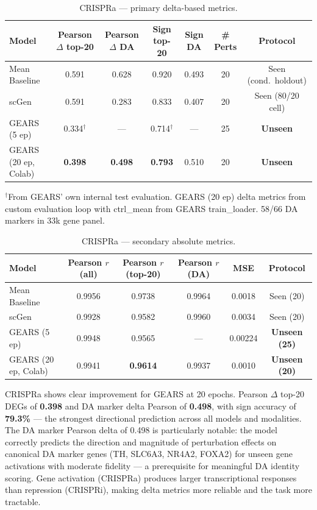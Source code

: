\documentclass[11pt,letterpaper]{article}
\begin{document}
\begin{table}[h]
\centering
\caption{CRISPRa --- primary delta-based metrics.}
\small
\begin{tabular}{lcccccc}
\toprule
Model & Pearson $\Delta$ top-20 & Pearson $\Delta$ DA & Sign top-20 & Sign DA & \# Perts & Protocol \\
\midrule
Mean Baseline        & 0.591           & 0.628           & 0.920 & 0.493 & 20 & Seen (cond.\ holdout) \\
scGen                & 0.591           & 0.283           & 0.833 & 0.407 & 20 & Seen (80/20 cell) \\
GEARS (5 ep)         & 0.334$^\dagger$ & ---             & 0.714$^\dagger$ & --- & 25 & \textbf{Unseen} \\
GEARS (20 ep, Colab) & \textbf{0.398}  & \textbf{0.498}  & \textbf{0.793} & 0.510 & 20 & \textbf{Unseen} \\
\bottomrule
\end{tabular}
\vspace{2pt}
{\footnotesize $^\dagger$From GEARS' own internal test evaluation. GEARS (20 ep) delta metrics from custom evaluation loop with ctrl\_mean from GEARS train\_loader. 58/66 DA markers in 33k gene panel.}
\end{table}

\begin{table}[h]
\centering
\caption{CRISPRa --- secondary absolute metrics.}
\small
\begin{tabular}{lccccc}
\toprule
Model & Pearson $r$ (all) & Pearson $r$ (top-20) & Pearson $r$ (DA) & MSE & Protocol \\
\midrule
Mean Baseline        & 0.9956 & 0.9738          & 0.9964 & 0.0018  & Seen (20) \\
scGen                & 0.9928 & 0.9582          & 0.9960 & 0.0034  & Seen (20) \\
GEARS (5 ep)         & 0.9948 & 0.9565          & ---    & 0.00224 & \textbf{Unseen (25)} \\
GEARS (20 ep, Colab) & 0.9941 & \textbf{0.9614} & 0.9937 & 0.0010 & \textbf{Unseen (20)} \\
\bottomrule
\end{tabular}
\end{table}

CRISPRa shows clear improvement for GEARS at 20 epochs. Pearson $\Delta$ top-20 DEGs of
\textbf{0.398} and DA marker delta Pearson of \textbf{0.498}, with sign accuracy of
\textbf{79.3\%} --- the strongest directional prediction across all models and modalities.
The DA marker Pearson delta of 0.498 is particularly notable: the model correctly predicts the
direction and magnitude of perturbation effects on canonical DA marker genes (TH, SLC6A3, NR4A2,
FOXA2) for unseen gene activations with moderate fidelity --- a prerequisite for meaningful DA
identity scoring. Gene activation (CRISPRa) produces larger transcriptional responses than
repression (CRISPRi), making delta metrics more reliable and the task more tractable.
\end{document}
